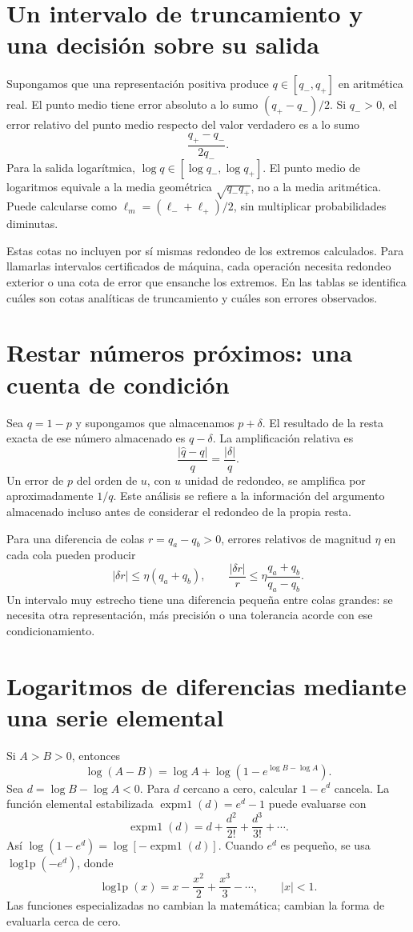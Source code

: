\documentclass[11pt,a4paper]{article}
\theoremstyle{definition}
\DeclareMathOperator{\expmone}{expm1}
\DeclareMathOperator{\logonep}{log1p}
\begin{document}
\section{Un intervalo de truncamiento y una decisión sobre su salida}
Supongamos que una representación positiva produce
$q\in[q_-,q_+]$ en aritmética real. El punto medio tiene error absoluto a lo sumo $(q_+-q_-)/2$. Si $q_->0$, el error relativo del punto medio respecto del valor verdadero es a lo sumo
\[
\frac{q_+-q_-}{2q_-}.
\]
Para la salida logarítmica,
$\log q\in[\log q_-,\log q_+]$.
El punto medio de logaritmos equivale a la media geométrica $\sqrt{q_-q_+}$, no a la media aritmética.
Puede calcularse como
$\ell_m=(\ell_-+\ell_+)/2$, sin multiplicar probabilidades diminutas.

Estas cotas no incluyen por sí mismas redondeo de los extremos calculados.
Para llamarlas intervalos certificados de máquina, cada operación necesita redondeo exterior o una cota de error que ensanche los extremos.
En las tablas se identifica cuáles son cotas analíticas de truncamiento y cuáles son errores observados.

\section{Restar números próximos: una cuenta de condición}
Sea $q=1-p$ y supongamos que almacenamos $p+\delta$.
El resultado de la resta exacta de ese número almacenado es $q-\delta$.
La amplificación relativa es
\[
\frac{|\widehat q-q|}{q}=\frac{|\delta|}{q}.
\]
Un error de $p$ del orden de $u$, con $u$ unidad de redondeo, se amplifica por aproximadamente $1/q$. Este análisis se refiere a la información del argumento almacenado incluso antes de considerar el redondeo de la propia resta.

Para una diferencia de colas $r=q_a-q_b>0$, errores relativos de magnitud $\eta$ en cada cola pueden producir
\[
|\delta r|\le\eta(q_a+q_b),\qquad
\frac{|\delta r|}{r}\le
\eta\frac{q_a+q_b}{q_a-q_b}.
\]
Un intervalo muy estrecho tiene una diferencia pequeña entre colas grandes: se necesita otra representación, más precisión o una tolerancia acorde con ese condicionamiento.

\section{Logaritmos de diferencias mediante una serie elemental}
Si $A>B>0$, entonces
\[
\log(A-B)=\log A+\log(1-e^{\log B-\log A}).
\]
Sea $d=\log B-\log A<0$. Para $d$ cercano a cero, calcular $1-e^d$ cancela.
La función elemental estabilizada $\expmone(d)=e^d-1$ puede evaluarse con
\[
\expmone(d)=d+\frac{d^2}{2!}+\frac{d^3}{3!}+\cdots.
\]
Así $\log(1-e^d)=\log[-\expmone(d)]$.
Cuando $e^d$ es pequeño, se usa $\logonep(-e^d)$, donde
\[
\logonep(x)=x-\frac{x^2}2+\frac{x^3}3-\cdots,\qquad |x|<1.
\]
Las funciones especializadas no cambian la matemática; cambian la forma de evaluarla cerca de cero.
\end{document}
